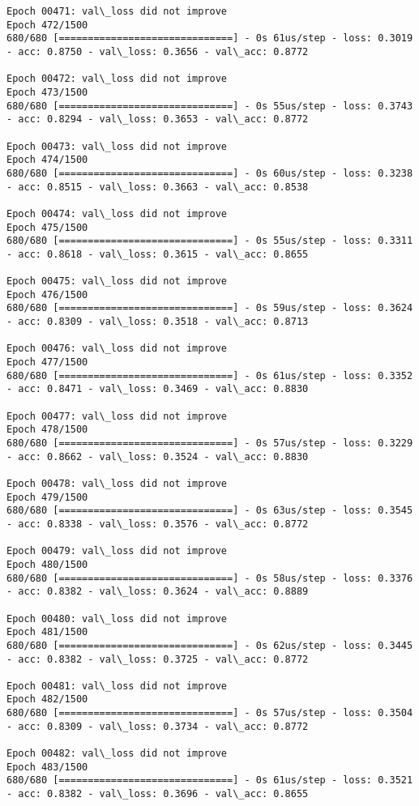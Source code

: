 \documentclass[11pt]{article}
\begin{document}
\begin{Verbatim}[commandchars=\\\{\}]
Epoch 00471: val\_loss did not improve
Epoch 472/1500
680/680 [==============================] - 0s 61us/step - loss: 0.3019 - acc: 0.8750 - val\_loss: 0.3656 - val\_acc: 0.8772

Epoch 00472: val\_loss did not improve
Epoch 473/1500
680/680 [==============================] - 0s 55us/step - loss: 0.3743 - acc: 0.8294 - val\_loss: 0.3653 - val\_acc: 0.8772

Epoch 00473: val\_loss did not improve
Epoch 474/1500
680/680 [==============================] - 0s 60us/step - loss: 0.3238 - acc: 0.8515 - val\_loss: 0.3663 - val\_acc: 0.8538

Epoch 00474: val\_loss did not improve
Epoch 475/1500
680/680 [==============================] - 0s 55us/step - loss: 0.3311 - acc: 0.8618 - val\_loss: 0.3615 - val\_acc: 0.8655

Epoch 00475: val\_loss did not improve
Epoch 476/1500
680/680 [==============================] - 0s 59us/step - loss: 0.3624 - acc: 0.8309 - val\_loss: 0.3518 - val\_acc: 0.8713

Epoch 00476: val\_loss did not improve
Epoch 477/1500
680/680 [==============================] - 0s 61us/step - loss: 0.3352 - acc: 0.8471 - val\_loss: 0.3469 - val\_acc: 0.8830

Epoch 00477: val\_loss did not improve
Epoch 478/1500
680/680 [==============================] - 0s 57us/step - loss: 0.3229 - acc: 0.8662 - val\_loss: 0.3524 - val\_acc: 0.8830

Epoch 00478: val\_loss did not improve
Epoch 479/1500
680/680 [==============================] - 0s 63us/step - loss: 0.3545 - acc: 0.8338 - val\_loss: 0.3576 - val\_acc: 0.8772

Epoch 00479: val\_loss did not improve
Epoch 480/1500
680/680 [==============================] - 0s 58us/step - loss: 0.3376 - acc: 0.8382 - val\_loss: 0.3624 - val\_acc: 0.8889

Epoch 00480: val\_loss did not improve
Epoch 481/1500
680/680 [==============================] - 0s 62us/step - loss: 0.3445 - acc: 0.8382 - val\_loss: 0.3725 - val\_acc: 0.8772

Epoch 00481: val\_loss did not improve
Epoch 482/1500
680/680 [==============================] - 0s 57us/step - loss: 0.3504 - acc: 0.8309 - val\_loss: 0.3734 - val\_acc: 0.8772

Epoch 00482: val\_loss did not improve
Epoch 483/1500
680/680 [==============================] - 0s 61us/step - loss: 0.3521 - acc: 0.8382 - val\_loss: 0.3696 - val\_acc: 0.8655


\end{Verbatim}
\end{document}
